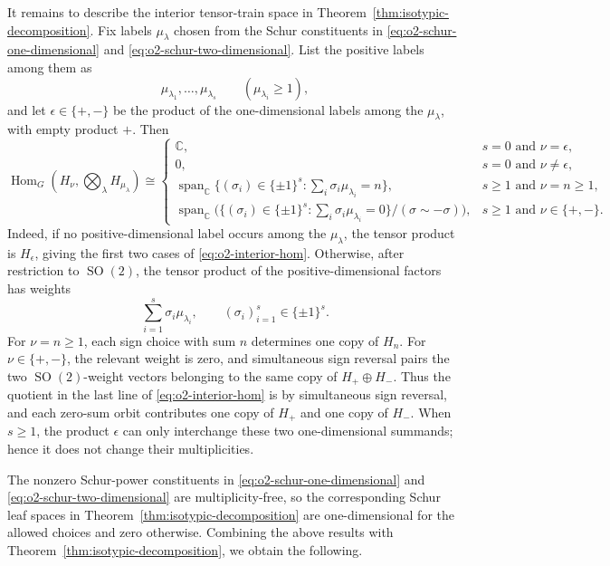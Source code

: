 \documentclass[11pt]{article}
\newcommand{\dsC}{\mathbb{C}}
\newcommand{\HomG}[2]{\operatorname{Hom}_G\!\left(#1,#2\right)}
\newcommand{\SO}{\operatorname{SO}}
\theoremstyle{definition}
\begin{document}
It remains to describe the interior tensor-train space in Theorem~\ref{thm:isotypic-decomposition}.  Fix labels $\mu_\lambda$ chosen from the Schur constituents in \eqref{eq:o2-schur-one-dimensional} and \eqref{eq:o2-schur-two-dimensional}.  List the positive labels among them as
\[
  \mu_{\lambda_1},\dots,\mu_{\lambda_s}\qquad(\mu_{\lambda_i}\ge 1),
\]
and let $\epsilon\in\{+,-\}$ be the product of the one-dimensional labels among the $\mu_\lambda$, with empty product $+$.  Then
\begin{equation}\label{eq:o2-interior-hom}
  \HomG{H_\nu}{\bigotimes_\lambda H_{\mu_\lambda}}
  \cong
  \begin{cases}
    \dsC, & s=0\text{ and }\nu=\epsilon,\\
    0, & s=0\text{ and }\nu\neq\epsilon,\\
    \operatorname{span}_{\dsC}\{(\sigma_i)\in\{\pm1\}^s:\sum_i\sigma_i \mu_{\lambda_i}=n\},
      & s\ge 1\text{ and }\nu=n\ge 1,\\
    \operatorname{span}_{\dsC}\bigl(\{(\sigma_i)\in\{\pm1\}^s:\sum_i\sigma_i \mu_{\lambda_i}=0\}/(\sigma\sim-\sigma)\bigr),
      & s\ge 1\text{ and }\nu\in\{+,-\}.
  \end{cases}
\end{equation}
Indeed, if no positive-dimensional label occurs among the $\mu_\lambda$, the tensor product is $H_\epsilon$, giving the first two cases of \eqref{eq:o2-interior-hom}.  Otherwise, after restriction to $\SO(2)$, the tensor product of the positive-dimensional factors has weights
\[
  \sum_{i=1}^s \sigma_i \mu_{\lambda_i},
  \qquad
  (\sigma_i)_{i=1}^s\in\{\pm1\}^s.
\]
For $\nu=n\ge1$, each sign choice with sum $n$ determines one copy of $H_n$.  For $\nu\in\{+,-\}$, the relevant weight is zero, and simultaneous sign reversal pairs the two $\SO(2)$-weight vectors belonging to the same copy of $H_+\oplus H_-$.  Thus the quotient in the last line of \eqref{eq:o2-interior-hom} is by simultaneous sign reversal, and each zero-sum orbit contributes one copy of $H_+$ and one copy of $H_-$.  When $s\ge1$, the product $\epsilon$ can only interchange these two one-dimensional summands; hence it does not change their multiplicities.

The nonzero Schur-power constituents in \eqref{eq:o2-schur-one-dimensional} and \eqref{eq:o2-schur-two-dimensional} are multiplicity-free, so the corresponding Schur leaf spaces in Theorem~\ref{thm:isotypic-decomposition} are one-dimensional for the allowed choices and zero otherwise.  Combining the above results with Theorem~\ref{thm:isotypic-decomposition}, we obtain the following.
\end{document}
